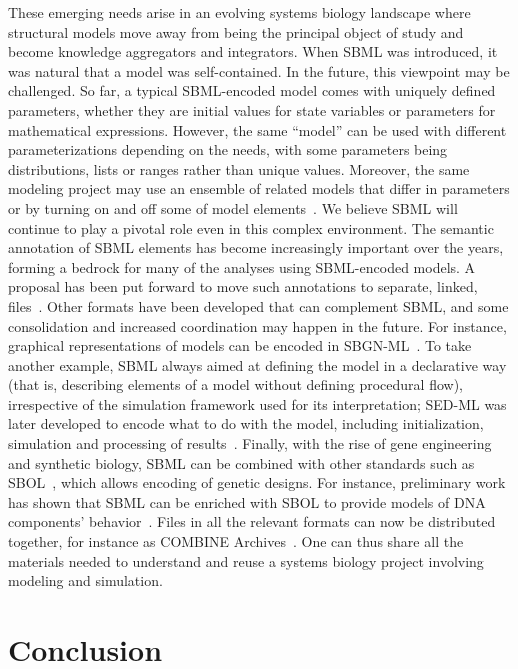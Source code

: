 \documentclass[]{draft-sbml-paper}
\begin{document}
These emerging needs arise in an evolving systems biology landscape where structural models move away from being the principal object of study and become knowledge aggregators and integrators. When SBML was introduced, it was natural that a model was self-contained. In the future, this viewpoint may be challenged. So far, a typical SBML-encoded model comes with uniquely defined parameters, whether they are initial values for state variables or parameters for mathematical expressions. However, the same ``model'' can be used with different parameterizations depending on the needs, with some parameters being distributions, lists or ranges rather than unique values. Moreover, the same modeling project may use an ensemble of related models that differ in parameters or by turning on and off some of model elements~\citep{kuepfer2007ensemble, waltemath2016toward}. We believe SBML will continue to play a pivotal role even in this complex environment. The semantic annotation of SBML elements has become increasingly important over the years, forming a bedrock for many of the analyses using SBML-encoded models.  A proposal has been put forward to move such annotations to separate, linked, files~\citep{Neal2019harmonizing}. Other formats have been developed that can complement SBML, and some consolidation and increased coordination may happen in the future. For instance, graphical representations of models can be encoded in SBGN-ML~\citep{VanIersel2012}.  To take another example, SBML always aimed at defining the model in a declarative way (that is, describing elements of a model without defining procedural flow), irrespective of the simulation framework used for its interpretation;  SED-ML was later developed to encode what to do with the model, including initialization, simulation and processing of results~\citep{waltemath2011reproducible}. Finally, with the rise of gene engineering and synthetic biology, SBML can be combined with other standards such as SBOL~\citep{galdzicki_2014}, which allows encoding of genetic designs. For instance, preliminary work has shown that SBML can be enriched with SBOL to provide models of DNA components' behavior~\citep{Roehner2014a}. Files in all the relevant formats can now be distributed together, for instance as COMBINE Archives~\citep{bergmann2014combine}. One can thus share all the materials needed to understand and reuse a systems biology project involving modeling and simulation.


\section*{Conclusion}
\end{document}

